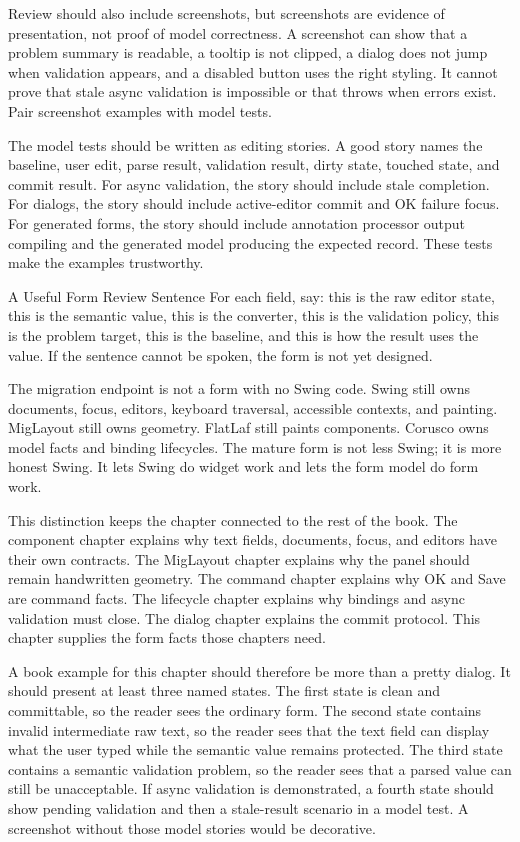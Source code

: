 Review should also include screenshots, but screenshots are evidence of
presentation, not proof of model correctness. A screenshot can show that a
problem summary is readable, a tooltip is not clipped, a dialog does not jump
when validation appears, and a disabled button uses the right styling. It
cannot prove that stale async validation is impossible or that 
throws when errors exist. Pair screenshot examples with model tests.

The model tests should be written as editing stories. A good story names the
baseline, user edit, parse result, validation result, dirty state, touched
state, and commit result. For async validation, the story should include stale
completion. For dialogs, the story should include active-editor commit and OK
failure focus. For generated forms, the story should include annotation
processor output compiling and the generated model producing the expected
record. These tests make the examples trustworthy.

\begin{detailbox}{A Useful Form Review Sentence}
For each field, say: this is the raw editor state, this is the semantic value,
this is the converter, this is the validation policy, this is the problem
target, this is the baseline, and this is how the result uses the value. If the
sentence cannot be spoken, the form is not yet designed.
\end{detailbox}

The migration endpoint is not a form with no Swing code. Swing still owns
documents, focus, editors, keyboard traversal, accessible contexts, and
painting. MigLayout still owns geometry. FlatLaf still paints components.
Corusco owns model facts and binding lifecycles. The mature form is not less
Swing; it is more honest Swing. It lets Swing do widget work and lets the form
model do form work.

This distinction keeps the chapter connected to the rest of the book. The
component chapter explains why text fields, documents, focus, and editors have
their own contracts. The MigLayout chapter explains why the panel should remain
handwritten geometry. The command chapter explains why OK and Save are command
facts. The lifecycle chapter explains why bindings and async validation must
close. The dialog chapter explains the commit protocol. This chapter supplies
the form facts those chapters need.

A book example for this chapter should therefore be more than a pretty dialog.
It should present at least three named states. The first state is clean and
committable, so the reader sees the ordinary form. The second state contains
invalid intermediate raw text, so the reader sees that the text field can
display what the user typed while the semantic value remains protected. The
third state contains a semantic validation problem, so the reader sees that a
parsed value can still be unacceptable. If async validation is demonstrated, a
fourth state should show pending validation and then a stale-result scenario in
a model test. A screenshot without those model stories would be decorative.

